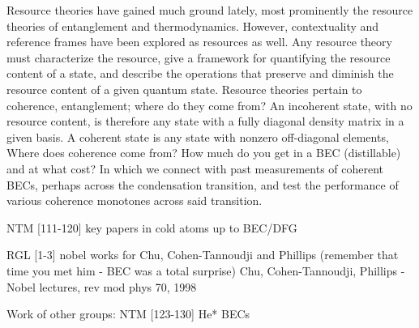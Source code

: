 	Resource theories have gained much ground lately, most prominently the resource theories of entanglement and thermodynamics. However, contextuality and reference frames have been explored as resources as well. Any resource theory must characterize the resource, give a framework for quantifying the resource content of a state, and describe the operations that preserve and diminish the resource content of a given quantum state. Resource theories pertain to coherence, entanglement; where do they come from? An incoherent state, with no resource content, is therefore any state with a fully diagonal density matrix in a given basis. A coherent state is any state with  nonzero off-diagonal elements, Where does coherence come from? How much do you get in a BEC (distillable) and at what cost?	In which we connect with past measurements of coherent BECs, perhaps across the condensation transition, and test the performance of various coherence monotones across said transition. 


	NTM [111-120] key papers in cold atoms up to BEC/DFG 

RGL [1-3] nobel works for Chu, Cohen-Tannoudji and Phillips (remember that time you met him - BEC was a total surprise) 
	Chu, Cohen-Tannoudji, Phillips - Nobel lectures, rev mod phys 70, 1998

		Work of other groups:
		NTM [123-130] He* BECs 
		
